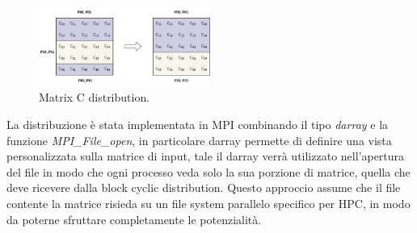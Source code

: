 \documentclass[conference]{IEEEtran}
\begin{document}
\begin{figure}
    \centering
    \includegraphics[width=0.5\textwidth]{resources/matrixC_row_block_cyclic_distribution.jpg}
    \caption{Matrix C distribution.}
    \label{fig:matrix_c_distribution}
\end{figure}
La distribuzione è stata implementata in MPI combinando il tipo \textit{darray} e la funzione \textit{MPI\_File\_open}, in particolare darray permette di definire una vista personalizzata sulla matrice di input, tale il darray verrà utilizzato nell'apertura del file in modo che ogni processo veda solo la sua porzione di matrice, quella che deve ricevere dalla block cyclic distribution. Questo approccio assume che il file contente la matrice risieda su un file system parallelo specifico per HPC, in modo da poterne sfruttare completamente le potenzialità.
\end{document}
